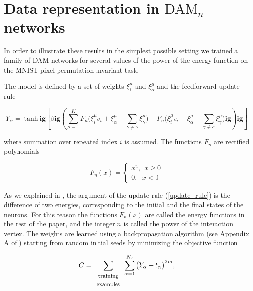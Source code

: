  \section{Data representation in $\text{DAM}_n$ networks} \label{DAM networks} In order to illustrate these results in the simplest possible setting we trained a family of DAM networks for several values of the power of the energy function on the MNIST pixel permutation invariant task. 

 The model is defined by  a set of weights $\xi^\mu_i$ and $\xi^\mu_\alpha$ and the feedforward update rule

\begin{equation}
Y_\alpha=\tanh\mathbf{ig}[ \beta \mathbf{ig}(\sum\limits_{\mu=1}^K F_n\big(\xi^\mu_i v_i + \xi^\mu_\alpha - \sum\limits_{\gamma \neq \alpha} \xi^\mu_\gamma  \big) -F_n\big(\xi^\mu_i v_i - \xi^\mu_\alpha - \sum\limits_{\gamma \neq \alpha} \xi^\mu_\gamma\big)  \mathbf{ig})\mathbf{ig}] \label{update_rule}
\end{equation}

where summation over repeated index $i$ is assumed. The functions $F_n$ are rectified polynomials~\cite{Krotov Hopfield}

\begin{equation}\label{rect_polynom} 
 F_n(x)=\begin{cases}x^n,  \ \ x\geq0\\
0, \ \ \ x<0
\end{cases}
\end{equation}

 
As we explained in \cite{Krotov Hopfield}, the argument of the update rule (\ref{update_rule}) is the difference of two energies, corresponding to the initial and the final states of the neurons. For this reason the functions $F_n(x)$ are called the energy functions in the rest of the paper, and the integer $n$ is called the power of the interaction vertex. The weights are learned using a backpropagation algorithm (see Appendix A of \cite{Krotov Hopfield}) starting from random initial seeds by minimizing the objective function

\begin{equation}
C=\sum\limits_{\begin{array}{c} \text{\footnotesize{training}}\\ \text{\footnotesize{examples}} \end{array}} \sum\limits_{\alpha=1}^{N_c} \big(Y_\alpha - t_\alpha\big)^{2m}, \label{objective_function}
\end{equation}

